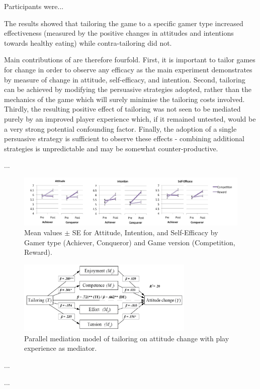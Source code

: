 \documentclass[11pt]{article}
\begin{document}
Participants were...

The results showed that tailoring the game to a specific gamer type increased effectiveness (measured by the positive changes in attitudes and intentions towards healthy eating) while contra-tailoring did not.

Main contributions of \citet{orji2017} are therefore fourfold. First, it is important to tailor games for change in order to observe any efficacy as the main experiment demonstrates by measure of change in attitude, self-efficacy, and intention. Second, tailoring can be achieved by modifying the persuasive strategies adopted, rather than the mechanics of the game which will surely minimise the tailoring costs involved. 
Thirdly, the resulting positive effect of tailoring was not seen to be mediated purely by an improved player experience which, if it remained untested, would be a very strong potential confounding factor. Finally, the adoption of a single persuasive strategy is sufficient to observe these effects - combining additional strategies is unpredictable and may be somewhat counter-productive.

...

\begin{figure}[H]
\centering
\includegraphics[width=\textwidth]{img/orji2017-tailoring-results.png} 
\caption{Mean values $\pm$ SE for Attitude, Intention, and Self-Efficacy by Gamer type (Achiever, Conqueror) and Game version (Competition, Reward).}\label{fig:orji2017-tailoring-results}
\end{figure}

\begin{figure}[H]
\centering
\includegraphics[width=0.75\textwidth]{img/orji2017-tailoring-mediation-results.png} 
\caption{Parallel mediation model of tailoring on attitude change with play experience as mediator.}\label{fig:orji2017-tailoring-mediation-results}
\end{figure}

...

...


\newpage
\small

\normalsize
\end{document}
